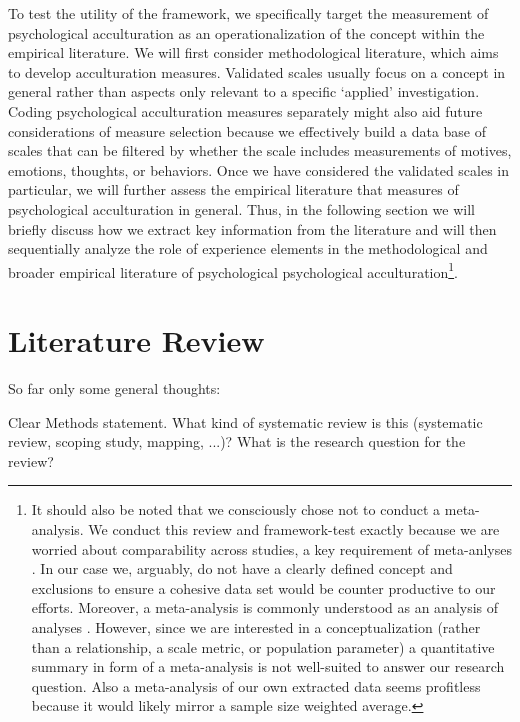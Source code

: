 \documentclass[nobib]{tufte-handout}
\begin{document}
To test the utility of the framework, we specifically target the measurement of psychological acculturation as an operationalization of the concept within the empirical literature. We will first consider methodological literature, which aims to develop acculturation measures. Validated scales usually focus on a concept in general rather than aspects only relevant to a specific `applied' investigation. Coding psychological acculturation measures separately might also aid future considerations of measure selection because we effectively build a data base of scales that can be filtered by whether the scale includes measurements of motives, emotions, thoughts, or behaviors. Once we have considered the validated scales in particular, we will further assess the empirical literature that measures of psychological acculturation in general. Thus, in the following section we will briefly discuss how we extract key information from the literature and will then sequentially analyze the role of experience elements in the methodological and broader empirical literature of psychological psychological acculturation\footnote{It should also be noted that we consciously chose not to conduct a meta-analysis. We conduct this review and framework-test exactly because we are worried about comparability across studies, a key requirement of meta-anlyses \citep{Pogue1998}. In our case we, arguably, do not have a clearly defined concept and exclusions to ensure a cohesive data set would be counter productive to our efforts. Moreover, a meta-analysis is commonly understood as an analysis of analyses \citep{Glass1976}. However, since we are interested in a conceptualization (rather than a relationship, a scale metric, or population parameter) a quantitative summary in form of a meta-analysis is not well-suited to answer our research question. Also a meta-analysis of our own extracted data seems profitless because it would likely mirror a sample size weighted average.}.

\section{Literature Review}

So far only some general thoughts:

Clear Methods statement. What kind of systematic review is this (systematic review, scoping study, mapping, ...)? What is the research question for the review?
\end{document}
